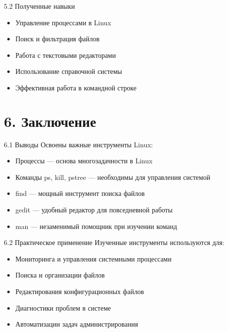 \documentclass[
  ignorenonframetext,
  aspectratio=169,
  russian,
]{beamer}
\providecommand{\tightlist}{%
  \setlength{\itemsep}{0pt}\setlength{\parskip}{0pt}}
\begin{document}
\begin{frame}{5.2 Полученные навыки}
\label{ux43fux43eux43bux443ux447ux435ux43dux43dux44bux435-ux43dux430ux432ux44bux43aux438}
\begin{itemize}[<+->]
\tightlist
\item
  Управление процессами в Linux
\item
  Поиск и фильтрация файлов
\item
  Работа с текстовыми редакторами
\item
  Использование справочной системы
\item
  Эффективная работа в командной строке
\end{itemize}
\end{frame}

\section{6. Заключение}\label{ux437ux430ux43aux43bux44eux447ux435ux43dux438ux435}

\begin{frame}{6.1 Выводы}
\label{ux432ux44bux432ux43eux434ux44b}
Освоены важные инструменты Linux:

\begin{itemize}[<+->]
\tightlist
\item
  Процессы --- основа многозадачности в Linux
\item
  Команды ps, kill, pstree --- необходимы для управления системой
\item
  find --- мощный инструмент поиска файлов
\item
  gedit --- удобный редактор для повседневной работы
\item
  man --- незаменимый помощник при изучении команд
\end{itemize}
\end{frame}

\begin{frame}{6.2 Практическое применение}
\label{ux43fux440ux430ux43aux442ux438ux447ux435ux441ux43aux43eux435-ux43fux440ux438ux43cux435ux43dux435ux43dux438ux435}
Изученные инструменты используются для:

\begin{itemize}[<+->]
\tightlist
\item
  Мониторинга и управления системными процессами
\item
  Поиска и организации файлов
\item
  Редактирования конфигурационных файлов
\item
  Диагностики проблем в системе
\item
  Автоматизации задач администрирования
\end{itemize}
\end{frame}
\end{document}
